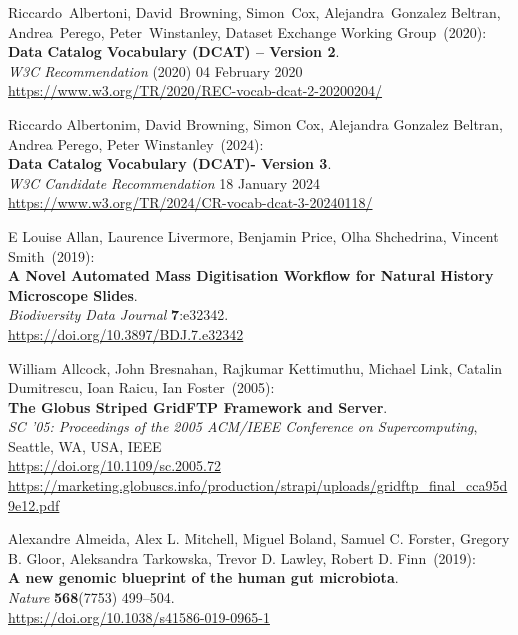 \begin{thebibliography}{9}
Riccardo~Albertoni, David~Browning, Simon~Cox, Alejandra~Gonzalez Beltran, Andrea~Perego, Peter~Winstanley, Dataset Exchange Working Group~(2020): \\
\textbf{Data Catalog Vocabulary (DCAT) -- Version 2}.\\
\emph{W3C Recommendation} (2020)  04 February 2020 \\
\url{https://www.w3.org/TR/2020/REC-vocab-dcat-2-20200204/}

Riccardo Albertonim, David Browning, Simon Cox, Alejandra Gonzalez Beltran, Andrea Perego, Peter Winstanley~(2024): \\
\textbf{Data Catalog Vocabulary (DCAT)- Version 3}.\\
\emph{W3C Candidate Recommendation} 18 January 2024\\
\url{https://www.w3.org/TR/2024/CR-vocab-dcat-3-20240118/}

E Louise Allan, Laurence Livermore, Benjamin Price, Olha Shchedrina, Vincent Smith~(2019): \\
\textbf{A Novel Automated Mass Digitisation Workflow for Natural History Microscope Slides}.\\
\emph{Biodiversity Data Journal} \textbf{7}:e32342.\\
\url{https://doi.org/10.3897/BDJ.7.e32342}

William Allcock, John Bresnahan, Rajkumar Kettimuthu, Michael Link, Catalin Dumitrescu, Ioan Raicu, Ian Foster~(2005): \\
\textbf{The Globus Striped GridFTP Framework and Server}.\\
\emph{{SC '05: Proceedings of the 2005 ACM/IEEE Conference on Supercomputing}},
{Seattle, WA, USA}, {IEEE} \\
\url{https://doi.org/10.1109/sc.2005.72}\\
\url{https://marketing.globuscs.info/production/strapi/uploads/gridftp_final_cca95d9e12.pdf}

Alexandre Almeida, Alex L. Mitchell, Miguel Boland, Samuel C. Forster, Gregory B. Gloor, Aleksandra Tarkowska, Trevor D. Lawley, Robert D. Finn~(2019): \\
\textbf{A new genomic blueprint of the human gut microbiota}.\\
\emph{Nature} \textbf{568}(7753) 499--504.\\
\url{https://doi.org/10.1038/s41586-019-0965-1}


\end{thebibliography}
